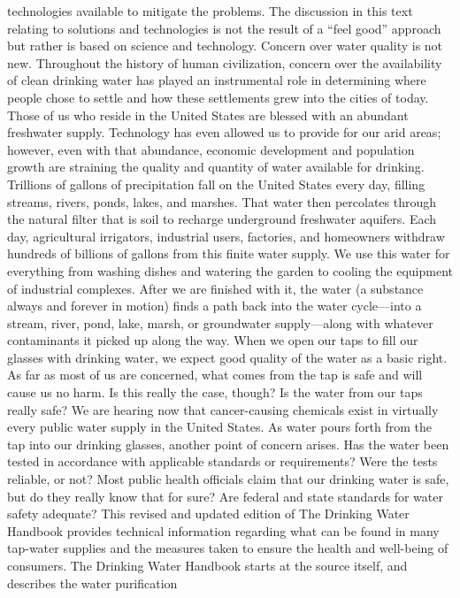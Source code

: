 \documentclass{article}
\begin{document}
technologies available to mitigate the problems. The discussion in this
text relating to solutions and technologies is not the result of a
``feel good'' approach but rather is based on science and technology.
Concern over water quality is not new. Throughout the history of human
civilization, concern over the availability of clean drinking water has
played an instrumental role in determining where people chose to settle
and how these settlements grew into the cities of today. Those of us who
reside in the United States are blessed with an abundant freshwater
supply. Technology has even allowed us to provide for our arid areas;
however, even with that abundance, economic development and population
growth are straining the quality and quantity of water available for
drinking. Trillions of gallons of precipitation fall on the United
States every day, filling streams, rivers, ponds, lakes, and marshes.
That water then percolates through the natural filter that is soil to
recharge underground freshwater aquifers. Each day, agricultural
irrigators, industrial users, factories, and homeowners withdraw
hundreds of billions of gallons from this finite water supply. We use
this water for everything from washing dishes and watering the garden to
cooling the equipment of industrial complexes. After we are finished
with it, the water (a substance always and forever in motion) finds a
path back into the water cycle---into a stream, river, pond, lake,
marsh, or groundwater supply---along with whatever contaminants it
picked up along the way. When we open our taps to fill our glasses with
drinking water, we expect good quality of the water as a basic right. As
far as most of us are concerned, what comes from the tap is safe and
will cause us no harm. Is this really the case, though? Is the water
from our taps really safe? We are hearing now that cancer-causing
chemicals exist in virtually every public water supply in the United
States. As water pours forth from the tap into our drinking glasses,
another point of concern arises. Has the water been tested in accordance
with applicable standards or requirements? Were the tests reliable, or
not? Most public health officials claim that our drinking water is safe,
but do they really know that for sure? Are federal and state standards
for water safety adequate? This revised and updated edition of The
Drinking Water Handbook provides technical information regarding what
can be found in many tap-water supplies and the measures taken to ensure
the health and well-being of consumers. The Drinking Water Handbook
starts at the source itself, and describes the water purification
\end{document}

